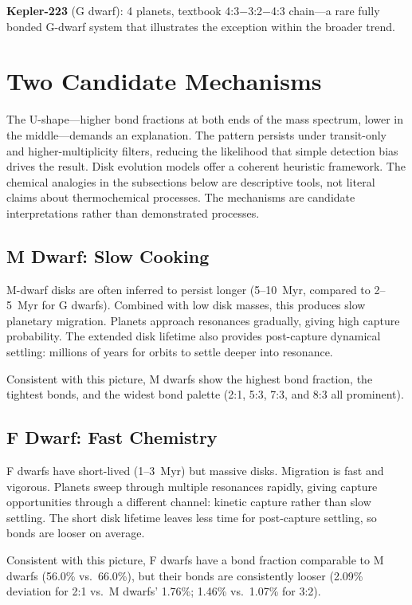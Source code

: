 \documentclass[twocolumn,usenatbib]{mnras}
\begin{document}
\textbf{Kepler-223} (G dwarf): 4 planets, textbook
4:3$-$3:2$-$4:3 chain---a rare fully bonded G-dwarf system that illustrates
the exception within the broader trend.

\section{Two Candidate Mechanisms}
\label{sec:mechanisms}

The U-shape---higher bond fractions at both ends of the mass spectrum, lower
in the middle---demands an explanation. The pattern persists under
transit-only and higher-multiplicity filters, reducing the likelihood that
simple detection bias drives the result. Disk evolution models offer a coherent
heuristic framework. The chemical analogies in the subsections below are
descriptive tools, not literal claims about thermochemical processes. The
mechanisms are candidate interpretations rather than demonstrated processes.

\subsection{M Dwarf: Slow Cooking}

M-dwarf disks are often inferred to persist longer (5--10~Myr, compared to
2--5~Myr for G dwarfs)\citep{yasui2010,haisch2001}. Combined with low disk
masses, this produces slow planetary migration. Planets approach resonances
gradually, giving high capture probability. The extended disk lifetime also
provides post-capture dynamical settling: millions of years for orbits to
settle deeper into resonance.

Consistent with this picture, M dwarfs show the highest bond fraction, the
tightest bonds, and the widest bond palette (2:1, 5:3, 7:3, and 8:3 all
prominent).

\subsection{F Dwarf: Fast Chemistry}

F dwarfs have short-lived (1--3~Myr) but massive
disks\citep{sicilia_aguilar}. Migration is fast and vigorous. Planets sweep
through multiple resonances rapidly, giving capture opportunities through a
different channel: kinetic capture rather than slow settling. The short disk
lifetime leaves less time for post-capture settling, so bonds are looser on
average.

Consistent with this picture, F dwarfs have a bond fraction comparable to M
dwarfs (56.0\% vs.\ 66.0\%), but their bonds are consistently looser (2.09\%
deviation for 2:1 vs.\ M dwarfs' 1.76\%; 1.46\% vs.\ 1.07\% for 3:2).
\end{document}
